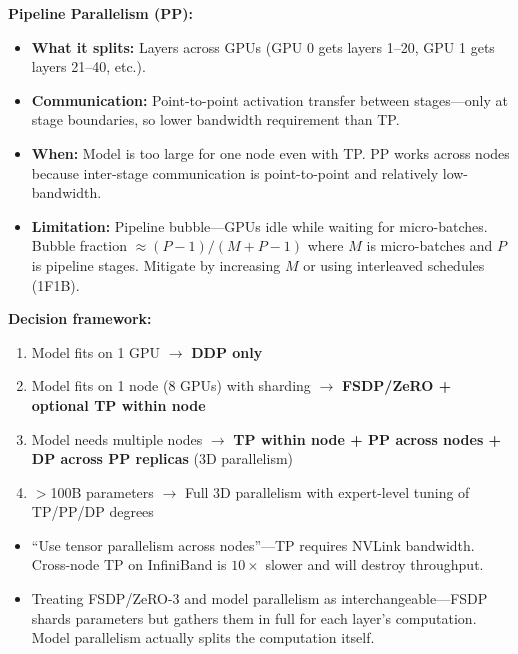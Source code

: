 \begin{interviewq}
\textbf{Pipeline Parallelism (PP):}
\begin{itemize}
    \item \textbf{What it splits:} Layers across GPUs (GPU 0 gets layers 1--20, GPU 1 gets layers 21--40, etc.).
    \item \textbf{Communication:} Point-to-point activation transfer between stages---only at stage boundaries, so lower bandwidth requirement than TP.
    \item \textbf{When:} Model is too large for one node even with TP. PP works across nodes because inter-stage communication is point-to-point and relatively low-bandwidth.
    \item \textbf{Limitation:} Pipeline bubble---GPUs idle while waiting for micro-batches. Bubble fraction $\approx (P-1)/(M+P-1)$ where $M$ is micro-batches and $P$ is pipeline stages. Mitigate by increasing $M$ or using interleaved schedules (1F1B).
\end{itemize}

\textbf{Decision framework:}
\begin{enumerate}
    \item Model fits on 1 GPU $\to$ \textbf{DDP only}
    \item Model fits on 1 node (8 GPUs) with sharding $\to$ \textbf{FSDP/ZeRO + optional TP within node}
    \item Model needs multiple nodes $\to$ \textbf{TP within node + PP across nodes + DP across PP replicas} (3D parallelism)
    \item $>$100B parameters $\to$ Full 3D parallelism with expert-level tuning of TP/PP/DP degrees
\end{enumerate}

\redflags
\begin{itemize}
    \item ``Use tensor parallelism across nodes''---TP requires NVLink bandwidth. Cross-node TP on InfiniBand is $10\times$ slower and will destroy throughput.
    \item Treating FSDP/ZeRO-3 and model parallelism as interchangeable---FSDP shards parameters but gathers them in full for each layer's computation. Model parallelism actually splits the computation itself.
\end{itemize}



\end{interviewq}
